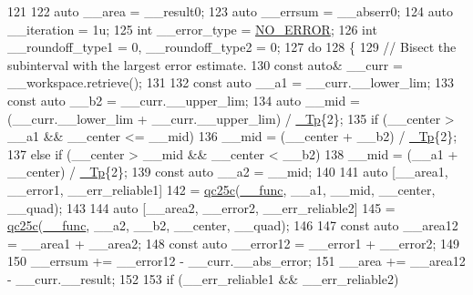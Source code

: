 \begin{DoxyCode}
121 
122       \textcolor{keyword}{auto} \_\_area = \_\_result0;
123       \textcolor{keyword}{auto} \_\_errsum = \_\_abserr0;
124       \textcolor{keyword}{auto} \_\_iteration = 1u;
125       \textcolor{keywordtype}{int} \_\_error\_type = \hyperlink{namespace____gnu__cxx_ad6c62dd86a596716cece6ac2d4cfd4b3ac31eecc280b10dec2efb4a2216ccc2e0}{NO\_ERROR};
126       \textcolor{keywordtype}{int} \_\_roundoff\_type1 = 0, \_\_roundoff\_type2 = 0;
127       \textcolor{keywordflow}{do}
128         \{
129           \textcolor{comment}{// Bisect the subinterval with the largest error estimate.}
130           \textcolor{keyword}{const} \textcolor{keyword}{auto}& \_\_curr = \_\_workspace.retrieve();
131 
132           \textcolor{keyword}{const} \textcolor{keyword}{auto} \_\_a1 = \_\_curr.\_\_lower\_lim;
133           \textcolor{keyword}{const} \textcolor{keyword}{auto} \_\_b2 = \_\_curr.\_\_upper\_lim;
134           \textcolor{keyword}{auto} \_\_mid = (\_\_curr.\_\_lower\_lim + \_\_curr.\_\_upper\_lim) / \hyperlink{namespace____gnu__cxx_a3b19a9c800ca194374ef9172290f7d79}{\_Tp}\{2\};
135           \textcolor{keywordflow}{if} (\_\_center > \_\_a1 && \_\_center <= \_\_mid)
136             \_\_mid = (\_\_center + \_\_b2) / \hyperlink{namespace____gnu__cxx_a3b19a9c800ca194374ef9172290f7d79}{\_Tp}\{2\};
137           \textcolor{keywordflow}{else} \textcolor{keywordflow}{if} (\_\_center > \_\_mid && \_\_center < \_\_b2)
138             \_\_mid = (\_\_a1 + \_\_center) / \hyperlink{namespace____gnu__cxx_a3b19a9c800ca194374ef9172290f7d79}{\_Tp}\{2\};
139           \textcolor{keyword}{const} \textcolor{keyword}{auto} \_\_a2 = \_\_mid;
140 
141           \textcolor{keyword}{auto} [\_\_area1, \_\_error1, \_\_err\_reliable1]
142             = \hyperlink{namespace____gnu__cxx_a0eeb3014f3114b5d73059433b58fba86}{qc25c}(\hyperlink{namespace____gnu__cxx_af2b2f0c7a2ae72b922b1afefae5a65b2}{\_\_func}, \_\_a1, \_\_mid, \_\_center, \_\_quad);
143 
144           \textcolor{keyword}{auto} [\_\_area2, \_\_error2, \_\_err\_reliable2]
145             = \hyperlink{namespace____gnu__cxx_a0eeb3014f3114b5d73059433b58fba86}{qc25c}(\hyperlink{namespace____gnu__cxx_af2b2f0c7a2ae72b922b1afefae5a65b2}{\_\_func}, \_\_a2, \_\_b2, \_\_center, \_\_quad);
146 
147           \textcolor{keyword}{const} \textcolor{keyword}{auto} \_\_area12 = \_\_area1 + \_\_area2;
148           \textcolor{keyword}{const} \textcolor{keyword}{auto} \_\_error12 = \_\_error1 + \_\_error2;
149 
150           \_\_errsum += \_\_error12 - \_\_curr.\_\_abs\_error;
151           \_\_area += \_\_area12 - \_\_curr.\_\_result;
152 
153           \textcolor{keywordflow}{if} (\_\_err\_reliable1 && \_\_err\_reliable2)

\end{DoxyCode}
